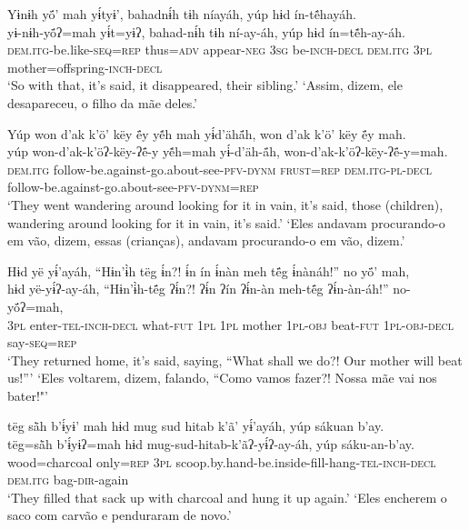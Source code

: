 \documentclass[output=paper,
modfonts,nonflat
]{langsci/langscibook}
\begin{document}
\newpage
\ea  Yɨnɨh yö́’ mah yɨ́tyɨ’, bahadnɨ́h tɨh níayáh, yúp hɨd ín-tẽ́hayáh.\\
\gll yɨ-nɨh-yö́ʔ=mah yɨ́t=yɨʔ, bahad-nɨ́h tɨh ní-ay-áh, yúp hɨd ín=tẽ́h-ay-áh.\\
     \textsc{dem.itg-}be.like\textsc{-seq=rep} thus\textsc{=adv} appear\textsc{-neg} \textsc{3sg} be\textsc{-inch-decl} \textsc{dem.itg} \textsc{3pl} mother=offspring\textsc{-inch-decl}\\
\glt ‘So with that, it’s said, it disappeared, their sibling.'
\glt ‘Assim, dizem, ele desapareceu, o filho da mãe deles.'
\z 

\ea  Yúp won d’ak k’ö’ këy ë́y yẽ́h mah yɨ́d’ähä́h, won d’ak k’ö’ këy ë́y mah.\\
\gll yúp won-d’ak-k’öʔ-këy-ʔë́-y yẽ́h=mah yɨ́-d’äh-ä́h, won-d’ak-k’öʔ-këy-ʔë́-y=mah.\\
     \textsc{dem.itg} follow-be.against-go.about-see\textsc{-pfv-dynm} \textsc{frust=rep} \textsc{dem.itg-pl-decl} follow-be.against-go.about-see\textsc{-pfv-dynm=rep}\\
\glt ‘They went wandering around looking for it in vain, it’s said, those (children), wandering around looking for it in vain, it’s said.'
\glt ‘Eles andavam procurando-o em vão, dizem, essas (crianças), andavam procurando-o em vão, dizem.'
\z 

\ea  Hɨd yë yɨ́’ayáh, “Hɨn’ɨ̀h tëg ɨ́n?! ɨ́n ín ɨ́nàn meh të́g ɨ́nànáh!” no yö́’ mah,\\
\gll hɨd yë-yɨ́ʔ-ay-áh, “Hɨn’ɨ̀h-të́g ʔɨ́n?! ʔɨ́n ʔín ʔɨ́n-àn meh-të́g ʔɨ́n-àn-áh!” no-yö́ʔ=mah,\\
     \textsc{3pl} enter\textsc{-tel-inch-decl} what\textsc{-fut} \textsc{1pl} \textsc{1pl} mother \textsc{1pl-obj} beat\textsc{-fut} \textsc{1pl-obj-decl} say\textsc{-seq=rep}\\
\glt ‘They returned home, it’s said, saying, “What shall we do?! Our mother will beat us!”'
\glt ‘Eles voltarem, dizem, falando, “Como vamos fazer?! Nossa mãe vai nos bater!"'
\z 

\ea  tëg sä̀h b’ɨ́yɨ’ mah hɨd mug sud hitab k’ã’ yɨ́’ayáh, yúp sákuan b'ay.\\
\gll tëg=sä̀h b’ɨ́yɨʔ=mah hɨd mug-sud-hitab-k’ãʔ-yɨ́ʔ-ay-áh, yúp sáku-an-b'ay.\\
     wood=charcoal only\textsc{=rep} \textsc{3pl} scoop.by.hand-be.inside-fill-hang\textsc{-tel-inch-decl} \textsc{dem.itg} bag\textsc{-dir}-again\\
\glt ‘They filled that sack up with charcoal and hung it up again.'
\glt ‘Eles encherem o saco com carvão e penduraram de novo.'
\z
\end{document}

